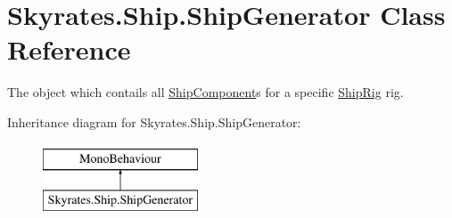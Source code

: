 \hypertarget{class_skyrates_1_1_ship_1_1_ship_generator}{\section{Skyrates.\-Ship.\-Ship\-Generator Class Reference}
\label{class_skyrates_1_1_ship_1_1_ship_generator}
}


The object which contails all \hyperlink{class_skyrates_1_1_ship_1_1_ship_component}{Ship\-Component}s for a specific \hyperlink{class_skyrates_1_1_ship_1_1_ship_rig}{Ship\-Rig} rig.  


Inheritance diagram for Skyrates.\-Ship.\-Ship\-Generator\-:\begin{figure}[H]
\begin{center}
\leavevmode
\includegraphics[height=2.000000cm]{class_skyrates_1_1_ship_1_1_ship_generator}
\end{center}
\end{figure}
